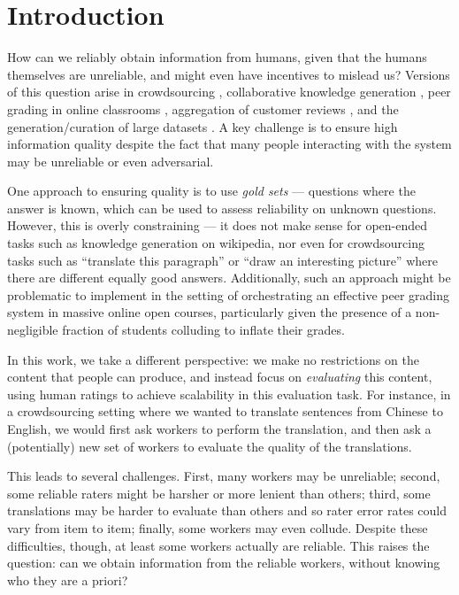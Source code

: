 \section{Introduction}
\label{sec:intro}


How can we reliably obtain information from humans, given that the humans 
themselves are unreliable, and might even have incentives to mislead us?
Versions of this question arise in crowdsourcing \citep{vuurens2011spam}, 
collaborative knowledge generation \citep{priedhorsky2007creating}, peer grading 
in online classrooms \citep{kulkarni2015peer,piech2013tuned},  aggregation 
of customer reviews \citep{harmon2004amazon}, and the generation/curation of large datasets \citep{deng2009imagenet}. A key challenge is to ensure 
high information quality despite the fact that many people interacting with 
the system may be unreliable or even adversarial.

One approach to ensuring quality is to use \emph{gold sets} --- questions where 
the answer is known, which can be used to assess reliability on unknown questions. 
However, this is overly constraining --- it does not make sense for open-ended 
tasks such as knowledge generation on wikipedia, nor even for crowdsourcing 
tasks such as ``translate this paragraph'' or ``draw an interesting picture'' 
where there are different equally good answers.   Additionally, such an approach might be problematic to implement in the setting of orchestrating an effective peer grading system in massive online open courses, particularly given the presence of a non-negligible fraction of students colluding to inflate their grades.

In this work, we take a different perspective: we make no restrictions on the 
content that people can produce, and instead focus on \emph{evaluating} this 
content, using human ratings to achieve scalability in this evaluation task. 
For instance, in a crowdsourcing setting where we wanted to translate sentences 
from Chinese to English, we would first ask workers to perform the translation, 
and then ask a (potentially) new set of workers to evaluate the quality of 
the translations.   

This leads to several challenges. First, many workers may be unreliable; 
second, some reliable raters might be harsher or more lenient than others; 
third, some translations may be harder to evaluate than others 
and so rater error rates could vary from item to item; 
finally, some workers may even collude. %
Despite these difficulties, though, at least some workers 
actually are reliable. This raises the question: can we obtain 
information from the reliable workers, without knowing who they are a priori?


